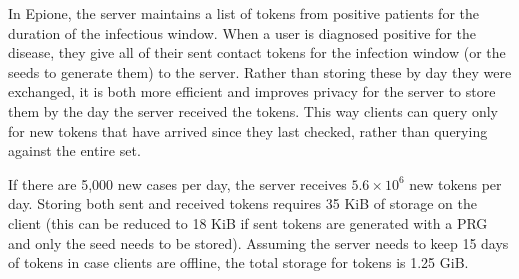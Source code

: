 \documentclass[11pt]{article} %
\newcommand{\dect}{\textsf{Epione}\xspace}
\newcommand{\sT}{\mathbf{T}}
\newcommand{\remove}[1]{}
\begin{document}
In \dect, the server maintains a list of tokens from positive patients for the duration of the infectious window. When a user is diagnosed positive for the disease, they give all of their sent contact tokens for the infection window (or the seeds to generate them) to the server. Rather than storing these by day they were exchanged, it is  both more efficient and improves privacy for the server to store them by the day the server received the tokens. This way clients can query only for new tokens that have arrived since they last checked, rather than querying against the entire set.

 If there are 5,000 new cases per day, the server receives $5.6 \times 10^6$ new tokens per day. Storing both sent and received tokens requires 35 KiB of storage on the client (this can be reduced to 18 KiB if sent tokens are generated with a PRG and only the seed needs to be stored). Assuming the server needs to keep 15 days of tokens in case clients are offline, the total storage for tokens is 1.25 GiB.

\remove{
	More concretely, imagine the client did a query yesterday with all of their received tokens, $\sT_{R,C}$, against the sent tokens on the server, set $\widehat{\sT}_S$, and found no tokens in common. Today the client has the received tokens set $\sT_{R,C} + \sT_{R,C}'$, where $\sT_{R,C}'$ is the set of tokens received since the last query was performed. Similarly, the server has set $\widehat{\sT}_S + \widehat{\sT}_S'$, where $\widehat{\sT}_S'$ is the set of tokens received by the server from users diagnosed positive since yesterday. The set $\widehat{\sT}_S$ cannot contain any tokens in $\sT_{R,C}'$, but set $\widehat{\sT}_S'$ can contain tokens from either $\sT_{R,C}$ or $\sT_{R,C}'$. Therefore, the client only needs to check if $\widehat{\sT}_S'$ has any intersection with $\sT_{R,C} + \sT_{R,C}'$. Thus, if the server keeps the database by day received, clients query with their entire received token set ($\sT_{R,C} + \sT_{R,C}'$) against the server set only for the most recent day ($\widehat{\sT}_S'$).}
\end{document}
